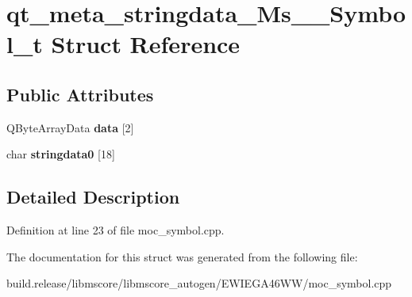 \hypertarget{structqt__meta__stringdata___ms_____symbol__t}{}\section{qt\+\_\+meta\+\_\+stringdata\+\_\+\+Ms\+\_\+\+\_\+\+Symbol\+\_\+t Struct Reference}
\label{structqt__meta__stringdata___ms_____symbol__t}
\subsection*{Public Attributes}
\begin{DoxyCompactItemize}
\item 
\mbox{\label{structqt__meta__stringdata___ms_____symbol__t_ab6457bcecf14bbab496a401f042e73e7}} 
Q\+Byte\+Array\+Data {\bfseries data} \mbox{[}2\mbox{]}
\item 
\mbox{\label{structqt__meta__stringdata___ms_____symbol__t_af2f38a2c19e6537b77a907ad98737c2b}} 
char {\bfseries stringdata0} \mbox{[}18\mbox{]}
\end{DoxyCompactItemize}


\subsection{Detailed Description}


Definition at line 23 of file moc\+\_\+symbol.\+cpp.



The documentation for this struct was generated from the following file\+:\begin{DoxyCompactItemize}
\item 
build.\+release/libmscore/libmscore\+\_\+autogen/\+E\+W\+I\+E\+G\+A46\+W\+W/moc\+\_\+symbol.\+cpp\end{DoxyCompactItemize}
